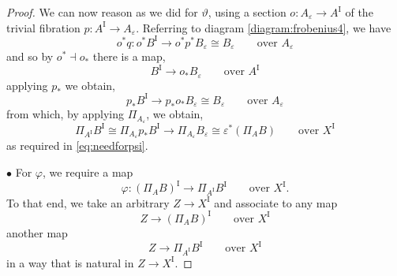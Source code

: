 \documentclass[11pt]{article}
\newcommand{\ra}{\ensuremath{\rightarrow}}
\newcommand{\I}{\ensuremath{\mathrm{I}}}
\theoremstyle{remark}
\theoremstyle{definition}
\begin{document}
\begin{proof}
We can now reason as we did for $\vartheta$, using a section $o :  A_\varepsilon \ra A^\I$ of the trivial fibration $p : A^\I \ra A_\varepsilon$. Referring to diagram \eqref{diagram:frobenius4}, we have
\[
o^*q : o^*B^\I \to o^*p^* B_\varepsilon \cong B_\varepsilon  \qquad \text{over $A_\varepsilon$}
\]
and so by $o^*\dashv o_*$ there is a map, 
\[
B^\I \to o_*B_\varepsilon  \qquad \text{over $A^\I$}
\]
applying $p_*$ we obtain,
\[
p_*B^\I \to p_*o_*B_\varepsilon \cong B_\varepsilon  \qquad \text{over $A_\varepsilon$}
\]
from which, by applying $\Pi_{A_\varepsilon}$, we obtain,
\[
\Pi_{A^\I}B^\I \cong \Pi_{A_\varepsilon} p_*B^\I \to \Pi_{A_\varepsilon}B_\varepsilon  \cong \varepsilon^*(\Pi_{A}B)   \qquad \text{over $X^\I$}
\]
as required in \eqref{eq:needforpsi}.

\medskip
\noindent $\bullet$ For $\varphi$, we require a map 
\[
\varphi : (\Pi_AB)^\I \to \Pi_{A^\I}B^\I \qquad \text{over $X^\I$.}
\]
To that end, we take an arbitrary $Z \ra X^\I$ and associate to any map 
\[
Z \to (\Pi_AB)^\I \qquad \text{over $X^\I$}
\]
another map 
\[
Z \to \Pi_{A^\I}B^\I \qquad \text{over $X^\I$}
\]
in a way that is natural in $Z \ra X^\I$.  


\end{proof}
\end{document}
